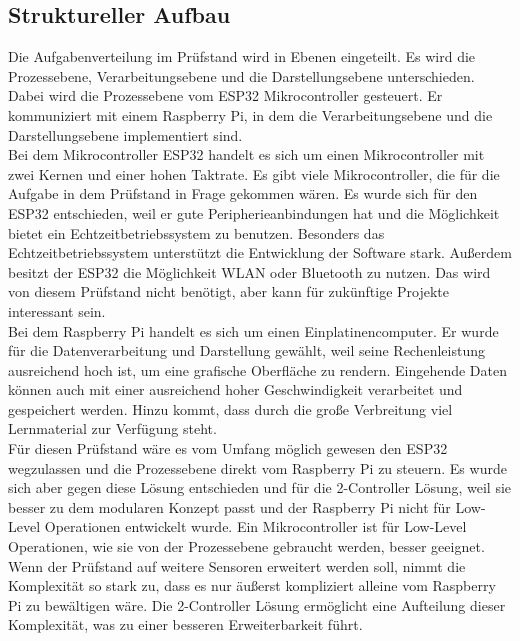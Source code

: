 \subsection{Struktureller Aufbau}
Die Aufgabenverteilung im Prüfstand wird in Ebenen eingeteilt. Es wird die Prozessebene, Verarbeitungsebene und die Darstellungsebene unterschieden.
\\
Dabei wird die Prozessebene vom ESP32 Mikrocontroller gesteuert. Er kommuniziert mit einem Raspberry Pi, in dem die Verarbeitungsebene und die Darstellungsebene implementiert sind.
\\
Bei dem Mikrocontroller ESP32 handelt es sich um einen Mikrocontroller mit zwei Kernen und einer hohen Taktrate. Es gibt viele Mikrocontroller, die für die Aufgabe in dem Prüfstand in Frage gekommen wären. Es wurde sich für den ESP32 entschieden, weil er gute Peripherieanbindungen hat und die Möglichkeit bietet ein Echtzeitbetriebssystem zu benutzen. Besonders das Echtzeitbetriebssystem unterstützt die Entwicklung der Software stark. Außerdem besitzt der ESP32 die Möglichkeit WLAN oder Bluetooth zu nutzen. Das wird von diesem Prüfstand nicht benötigt, aber kann für zukünftige Projekte interessant sein.
\cite{ESP32_datasheet}
\\
\noindent
Bei dem Raspberry Pi handelt es sich um einen Einplatinencomputer. Er wurde für die Datenverarbeitung und Darstellung gewählt, weil seine Rechenleistung ausreichend hoch ist, um eine grafische Oberfläche zu rendern. Eingehende Daten können auch mit einer ausreichend hoher Geschwindigkeit verarbeitet und gespeichert werden. Hinzu kommt, dass durch die große Verbreitung viel Lernmaterial zur Verfügung steht.
\cite[][S. 1ff]{Follmann2018}
\\
\noindent
Für diesen Prüfstand wäre es vom Umfang möglich gewesen den ESP32 wegzulassen und die Prozessebene direkt vom Raspberry Pi zu steuern. Es wurde sich aber gegen diese Lösung entschieden und für die 2-Controller Lösung, weil sie besser zu dem modularen Konzept passt und der Raspberry Pi nicht für Low-Level Operationen entwickelt wurde. Ein Mikrocontroller ist für Low-Level Operationen, wie sie von der Prozessebene gebraucht werden, besser geeignet. Wenn der Prüfstand auf weitere Sensoren erweitert werden soll, nimmt die Komplexität so stark zu, dass es nur äußerst kompliziert alleine vom Raspberry Pi zu bewältigen wäre. Die 2-Controller Lösung ermöglicht eine Aufteilung dieser Komplexität, was zu einer besseren Erweiterbarkeit führt. 
\\
\\
